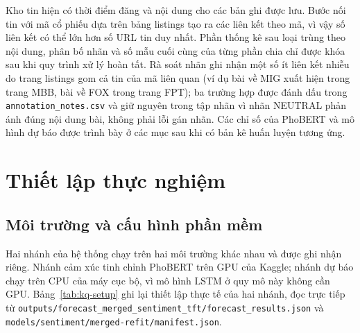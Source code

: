 Kho tin hiện có thời điểm đăng và nội dung cho các bản ghi được lưu. Bước nối tin với
mã cổ phiếu dựa trên bảng listings tạo ra các liên kết theo mã, vì vậy số liên kết có
thể lớn hơn số URL tin duy nhất. Phần thống kê sau loại trùng theo nội dung, phân bố
nhãn và số mẫu cuối cùng của từng phần chia chỉ được khóa sau khi quy trình xử lý hoàn tất.
Rà soát nhãn ghi nhận một số ít liên kết nhiễu do trang listings gom cả tin của
mã liên quan (ví dụ bài về MIG xuất hiện trong trang MBB, bài về FOX trong trang
FPT); ba trường hợp được đánh dấu trong \texttt{annotation\_notes.csv} và giữ
nguyên trong tập nhãn vì nhãn NEUTRAL phản ánh đúng nội dung bài, không phải lỗi
gán nhãn.
Các chỉ số của PhoBERT và mô hình dự báo được trình bày ở các mục sau khi có bản kê
huấn luyện tương ứng.

\section{Thiết lập thực nghiệm}
\label{sec:kq-setup}

\subsection{Môi trường và cấu hình phần mềm}

Hai nhánh của hệ thống chạy trên hai môi trường khác nhau và được ghi nhận riêng. Nhánh
cảm xúc tinh chỉnh PhoBERT trên GPU của Kaggle; nhánh dự báo chạy trên CPU của máy cục
bộ, vì mô hình LSTM ở quy mô này không cần GPU. Bảng~\ref{tab:kq-setup} ghi lại thiết
lập thực tế của hai nhánh, đọc trực tiếp từ
\texttt{outputs/forecast\_merged\_sentiment\_tft/forecast\_results.json} và
\texttt{models/sentiment/merged-refit/manifest.json}.

